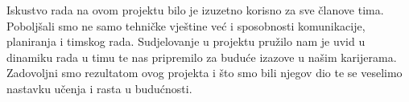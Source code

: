		Iskustvo rada na ovom projektu bilo je izuzetno korisno za sve članove tima. Poboljšali smo ne samo tehničke vještine već i sposobnosti komunikacije, planiranja i timskog rada. Sudjelovanje u projektu pružilo nam je uvid u dinamiku rada u timu te nas pripremilo za buduće izazove u našim karijerama. Zadovoljni smo rezultatom ovog projekta i što smo bili njegov dio te se veselimo nastavku učenja i rasta u budućnosti.
		
		\eject 